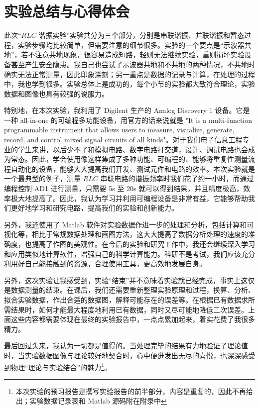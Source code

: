 \documentclass[UTF8]{article}
\theoremstyle{MyLineTheoremStyle} %
\theoremstyle{MyBlockTheoremStyle} %
\theoremstyle{MySubsubsectionStyle} %
\begin{document}
\section{实验总结与心得体会}

此次“$RLC$ 谐振实验”实验共分为三个部分，分别是串联谐振、并联谐振和暂态过程，实验步骤均比较简单，但需要注意的细节很多。实验的一个要点是“示波器共地”，若不注意共地现象，很容易造成短路，轻则无法继续实验，重则损坏实验设备甚至产生安全隐患。我自己也尝试了示波器共地和不共地的两种情况，不共地时确实无法正常测量，因此印象深刻；另一重点是数据的记录与计算，在处理的过程中，我也学到很多。实验总体上是成功的，每个小节的实验都大致符合理论，实验数据和图像也具有较强的说服力。

特别地，在本次实验，我利用了 Digilent 生产的 Analog Discovery 1 设备。它是一种 all-in-one 的可编程多功能设备，用官方的话来说就是 "It is a multi-function programmable instrument that allows users to measure, visualize, generate, record, and control mixed signal circuits of all kinds"。对于我们电子信息工程专业的学生来讲，以后少不了和模拟电路、数字电路打交道，设计、调试电路也会成为常态。因此，学会使用像这样集成了多种功能、可编程的、能够将重复性测量流程自动化的设备，能够大大提高我们开发、测试元件和电路的效率。本次实验就是一个最典型的例子，测量 $RLC$ 串联电路的谐振频率时我们花了约一小时，而通过编程控制 AD1 进行测量，只需要 5s 至 20s 就可以得到结果，并且精度极高，效率极大地提高了。因此，我认为学习并利用可编程设备是非常有益，它能够帮助我们更好地学习和研究电路，提高我们的实验和创新能力。

另外，我还使用了 Matlab 软件对实验数据作进一步的处理和分析，包括计算和可视化等，相比于常规数据处理和画图方法，这大大提高了数据分析处理的速度的准确度，也提高了作图的美观性。在今后的实验和研究工作中，我还会继续深入学习和应用类似地计算软件，增强自己的科学计算能力。科研不是考试，我们应该充分利用好自己能接触到的资源，合理使用工具，更高效地发展自身。

另外，这次实验让我感受到，实验“结束”并不意味着实验就已经完成，事实上这仅是数据测量的结束。在课后，我们还需要重新整理实验原理和过程，换算、分析、拟合实验数据，作出合适的数据图，解释可能存在的误差等。在根据已有数据求所需结果时，如何才能最大程度地利用已有数据，同时又尽可能地降低二次误差。上面这些内容都需要体现在最终的实验报告中，一点点累加起来，着实花费了我很多精力。

最后回过头来，我认为一切都是值得的。当处理完毕的结果有力地验证了理论值时，当实验数据图像与理论较好地契合时，心中便迸发出无尽的喜悦，也深深感受到物理“理论与实验结合”的魅力\footnote{本次实验的预习报告是撰写实验报告的前半部分，内容是重复的，因此不再给出；实验数据记录表和 Matlab 源码附在附录中}。
\end{document}
